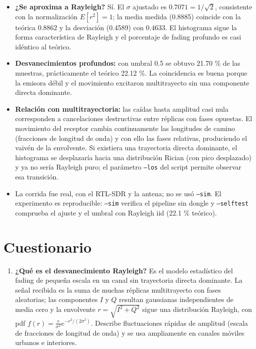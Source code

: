 \documentclass[11pt,a4paper]{article}
\begin{document}
\begin{itemize}
  \item \textbf{¿Se aproxima a Rayleigh?} Sí. El $\sigma$ ajustado es $0.7071 = 1/\sqrt{2}$, consistente con la normalización $E[r^2]=1$; la media medida (0.8885) coincide con la teórica $0.8862$ y la desviación (0.4589) con $0.4633$. El histograma sigue la forma característica de Rayleigh y el porcentaje de fading profundo es casi idéntico al teórico.
  \item \textbf{Desvanecimientos profundos:} con umbral 0.5 se obtuvo 21.70 \% de las muestras, prácticamente el teórico 22.12 \%. La coincidencia es buena porque la emisora débil y el movimiento excitaron multitrayecto sin una componente directa dominante.
  \item \textbf{Relación con multitrayectoria:} las caídas hasta amplitud casi nula corresponden a cancelaciones destructivas entre réplicas con fases opuestas. El movimiento del receptor cambia continuamente las longitudes de camino (fracciones de longitud de onda) y con ello las fases relativas, produciendo el vaivén de la envolvente. Si existiera una trayectoria directa dominante, el histograma se desplazaría hacia una distribución Rician (con pico desplazado) y ya no sería Rayleigh puro; el parámetro \texttt{--los} del script permite observar esa transición.
  \item La corrida fue real, con el RTL-SDR y la antena; no se usó \texttt{--sim}. El experimento es reproducible: \texttt{--sim} verifica el pipeline sin dongle y \texttt{--selftest} comprueba el ajuste y el umbral con Rayleigh iid (22.1 \% teórico).
\end{itemize}

\section{Cuestionario}

\begin{enumerate}
  \item \textbf{¿Qué es el desvanecimiento Rayleigh?} Es el modelo estadístico del fading de pequeña escala en un canal sin trayectoria directa dominante. La señal recibida es la suma de muchas réplicas multitrayecto con fases aleatorias; las componentes $I$ y $Q$ resultan gaussianas independientes de media cero y la envolvente $r=\sqrt{I^2+Q^2}$ sigue una distribución Rayleigh, con pdf $f(r)=\frac{r}{\sigma^2}e^{-r^2/(2\sigma^2)}$. Describe fluctuaciones rápidas de amplitud (escala de fracciones de longitud de onda) y se usa ampliamente en canales móviles urbanos e interiores.
\end{enumerate}
\end{document}
